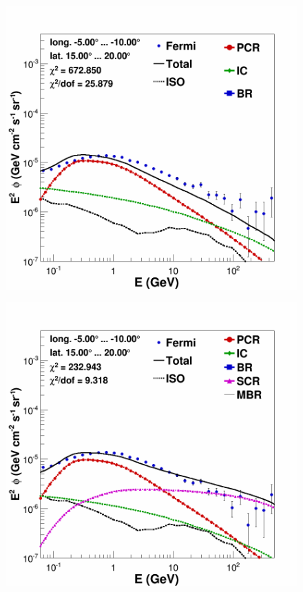 \begin{figure}[h]
  \centering
  \begin{minipage}[h]{0.45\textwidth}
  	\centering
	\includegraphics[width=1.\linewidth]{pic/results/bkgdonly_spectra_bubble_example.png}
  	\label{fig:SCRonly_bubble_spec}
  \end{minipage}
  \hfill
  \begin{minipage}[h]{0.45\textwidth}
	  \centering
	  \includegraphics[width=1.\linewidth]{pic/results/SCRonly_spectra_bubble_example.png}
	  \label{fig:BKGonly_bubble_spec}
  \end{minipage}	 
\end{figure}

